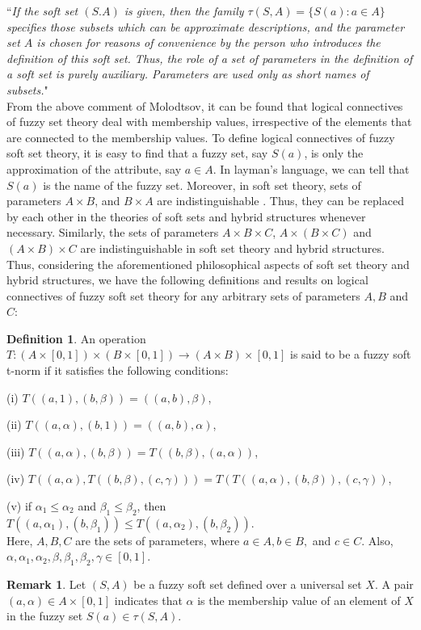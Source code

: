 \documentclass{article}
\theoremstyle{definition}
\newtheorem{definition}{Definition}[section]
\newtheorem{remark}{Remark}[section]
\begin{document}
``{\it If the soft set $(S.A)$ is given, then the family $\tau(S,A) = \{ S(a): a\in A\}$ specifies those subsets which can be approximate descriptions, and the parameter set $A$ is chosen for reasons of convenience by the person who introduces the definition of this soft set. Thus, the role of a set of parameters in the definition of a soft set is purely auxiliary. Parameters are used only as short names of subsets.}"\\


From the above comment of Molodtsov, it can be found that logical  connectives of fuzzy set theory deal with membership values, irrespective of the elements that are connected to the membership values. To define logical connectives of fuzzy soft set theory, it is easy to find that a fuzzy set, say $S(a)$, is only the approximation of the attribute, say  $a\in A$. In layman's language, we can tell that $S(a)$ is the name of the fuzzy set. Moreover, in soft set theory, sets of parameters $A\times B$, and $B\times A$ are indistinguishable \cite{2, 3, 4}. Thus, they can be replaced by each other in the theories of soft sets and hybrid structures whenever necessary. Similarly, the sets of parameters $A\times B\times C$, $A\times (B\times C)$ and $(A\times B)\times C$ are indistinguishable in soft set theory and hybrid structures. Thus, considering the aforementioned philosophical aspects of soft set theory and hybrid structures,   we have the following definitions and results on logical connectives of fuzzy soft set theory for any arbitrary sets of parameters $A, B$ and $C$:\\


\begin{definition}
    An operation $T:(A\times[0, 1])\times (B\times[0, 1]) \to (A\times B)\times[0, 1]$ is said to be a fuzzy soft t-norm if it satisfies the following conditions: 

    (i) $T((a, 1), (b, \beta))=((a, b), \beta)$,

    (ii) $T((a, \alpha), (b, 1))=((a, b), \alpha)$,
    
    (iii) $T((a, \alpha), (b, \beta))=T((b, \beta), (a, \alpha))$,

    (iv) $T((a, \alpha), T((b, \beta), (c, \gamma)))=T(T((a, \alpha), (b, \beta)), (c, \gamma))$,

    (v) if $\alpha_1 \leq \alpha_2$ and $\beta_1\leq \beta_2$, then $T((a, \alpha_1), (b, \beta_1))  \leq T((a, \alpha_2), (b, \beta_2))$.\\

    Here, $A, B, C$ are the sets of parameters, where $a\in A, b\in B,$  and $ c\in C$. Also, $\alpha, \alpha_1, \alpha_2, \beta, \beta_1, \beta_2, \gamma \in [0, 1]$.\\
\end{definition}
\begin{remark}
   Let $(S, A)$ be a fuzzy soft set defined over a universal set $X$. A pair $(a, \alpha)\in A\times [0, 1]$ indicates that $\alpha$ is the membership value of an element of $X$ in the fuzzy set $S(a)\in \tau(S, A)$.
\end{remark}
\end{document}
